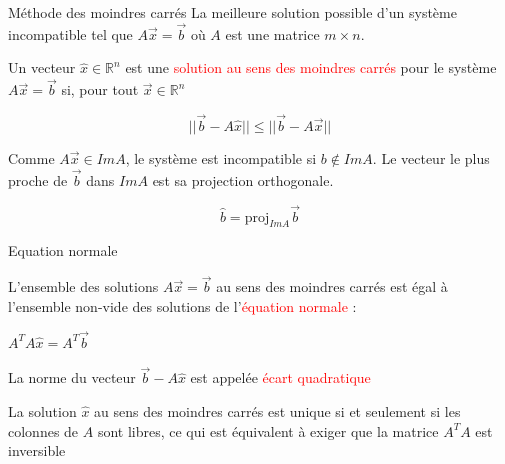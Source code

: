 \begin{parag}{Méthode des moindres carrés}
La meilleure solution possible d'un système incompatible tel que $A\vec{x} = \vec{b}$ où $A$ est une matrice $m \times n$.
    \begin{definition}
        Un vecteur $\hat{x} \in \mathbb{R}^n$ est une \textcolor{red}{solution au sens des moindres carrés} pour le système $A\vec{x} = \vec{b}$ si, pour tout $\vec{x} \in \mathbb{R}^n$
        \begin{formule}
            \[||\vec{b} - A\hat{x}|| \leq || \vec{b} - A\vec{x}||\]
        \end{formule}
    \end{definition}
    \begin{truc}
        Comme $A\vec{x} \in ImA$, le système est incompatible si $b \notin ImA$. Le vecteur le plus proche de $\vec{b}$ dans $ImA$ est sa projection orthogonale.
        \begin{formule}
            \[\hat{b} = \text{proj}_{ImA}\vec{b}\]
        \end{formule}
    \end{truc}
    \begin{subparag}{Equation normale}
        \begin{theoreme}
            L'ensemble des solutions $A\vec{x} = \vec{b}$ au sens des moindres carrés est égal à l'ensemble non-vide des solutions de l'\textcolor{red}{équation normale} : 
            \begin{formule}
                $A^TA\hat{x} = A^T\vec{b}$
            \end{formule}
        \end{theoreme}
        \begin{truc}
            La norme du vecteur $\vec{b} - A\hat{x}$ est appelée \textcolor{red}{écart quadratique}
        \end{truc}
        \begin{theoreme}
            La solution $\hat{x}$ au sens des moindres carrés est unique si et seulement si les colonnes de $A$ sont libres, ce qui est équivalent à exiger que la matrice $A^TA$ est inversible
        \end{theoreme}
    \end{subparag}
\end{parag}

